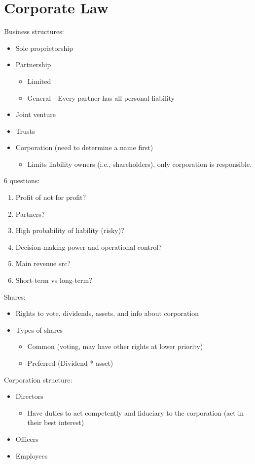 \documentclass[
  letterpaper,
  landscape,
  columns=3,
  draft,
]{cheatsheet}
\begin{document}
  \section{Corporate Law}
  Business structures:
  \begin{itemize}
    \item Sole proprietorship
    \item Partnership
          \begin{itemize}
            \item Limited
            \item General - Every partner has all personal liability
          \end{itemize}
    \item Joint venture
    \item Trusts
    \item Corporation (need to determine a name first)
          \begin{itemize}
            \item Limits liability owners (i.e., shareholders), only corporation is responsible.
          \end{itemize}
  \end{itemize}
  6 questions:
  \begin{enumerate}
    \item Profit of not for profit?
    \item Partners?
    \item High probability of liability (risky)?
    \item Decision-making power and operational control?
    \item Main revenue src?
    \item Short-term vs long-term?
  \end{enumerate}
  Shares:
  \begin{itemize}
    \item Rights to vote, dividends, assets, and info about corporation
    \item Types of shares
          \begin{itemize}
            \item Common (voting, may have other rights at lower priority)
            \item Preferred (Dividend * asset)
          \end{itemize}
  \end{itemize}
  Corporation structure:
  \begin{itemize}
    \item Directors
          \begin{itemize}
            \item Have duties to act competently and fiduciary to the corporation (act in their best interest)
          \end{itemize}
    \item Officers
    \item Employees
  \end{itemize}
\end{document}
